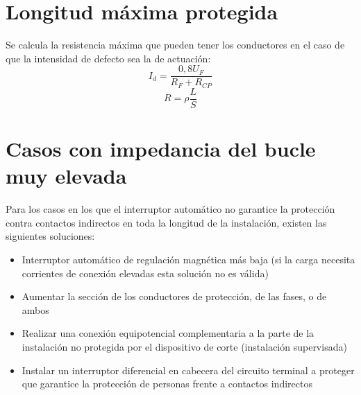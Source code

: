 \section{Longitud máxima protegida}
Se calcula la resistencia máxima que pueden tener los conductores en el caso de que la intensidad de defecto sea la de actuación:
\begin{equation}
	I_d=\dfrac{0,8 U_F}{R_F+R_{CP}}
\end{equation}
\begin{equation}
	R=\rho\dfrac{L}{S}
\end{equation}
\section{Casos con impedancia del bucle muy elevada}
Para los casos en los que el interruptor automático no garantice la
protección contra contactos indirectos en toda la longitud de la
instalación, existen las siguientes soluciones:
\begin{itemize}
	\item Interruptor automático de regulación magnética más baja (si la carga
	necesita corrientes de conexión elevadas esta solución no es válida)
	\item Aumentar la sección de los conductores de protección, de las fases, o
	de ambos
	\item Realizar una conexión equipotencial complementaria a la parte de la
	instalación no protegida por el dispositivo de corte (instalación supervisada)
	\item Instalar un interruptor diferencial en cabecera del circuito terminal a proteger
	que garantice la protección de personas frente a contactos indirectos
\end{itemize}